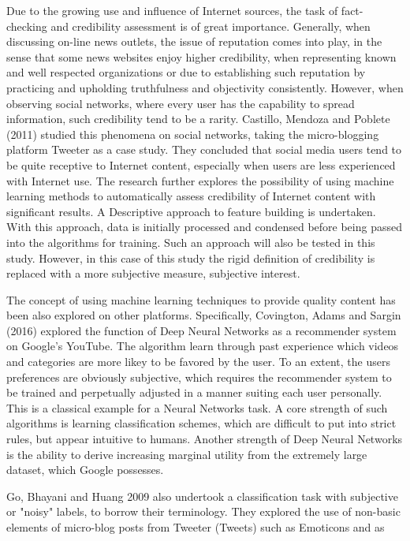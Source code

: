 		Due to the growing use and influence of Internet sources, the task of fact-checking and credibility assessment is of great importance. Generally, when discussing on-line news outlets, the issue of reputation comes into play, in the sense that some news websites enjoy higher credibility, when representing known and well respected organizations or due to establishing such reputation by practicing and upholding truthfulness and objectivity consistently. However, when observing social networks, where every user has the capability to spread information, such credibility tend to be a rarity. Castillo, Mendoza and Poblete (2011) \cite{castillo2011information} studied this phenomena on social networks, taking the micro-blogging platform Tweeter as a case study. They concluded that social media users tend to be quite receptive to Internet content, especially when users are less experienced with Internet use. The research further explores the possibility of using machine learning methods to automatically assess credibility of Internet content with significant results. A Descriptive approach to feature building is undertaken. With this approach, data is initially processed and condensed before being passed into the algorithms for training. Such an approach will also be tested in this study. However, in this case of this study the rigid definition of credibility is replaced with a more subjective measure, subjective interest.
		
		\par
		
		The concept of using machine learning techniques to provide quality content has been also explored on other platforms. Specifically, Covington, Adams and Sargin (2016) \cite{covington2016deep} explored the function of Deep Neural Networks as a recommender system on Google's YouTube. The algorithm learn through past experience which videos and categories are more likey to be favored by the user. To an extent, the users preferences are obviously subjective, which requires the recommender system to be trained and perpetually adjusted in a manner suiting each user personally. This is a classical example for a Neural Networks task. A core strength of such algorithms is learning classification schemes, which are difficult to put into strict rules, but appear intuitive to humans. Another strength of Deep Neural Networks is the ability to derive increasing marginal utility from the extremely large dataset, which Google possesses.
		
		\par
		
		Go, Bhayani and Huang 2009 \cite{go2009twitter} also undertook a classification task with subjective or "noisy" labels, to borrow their terminology. They explored the use of non-basic elements of micro-blog posts from Tweeter (Tweets) such as Emoticons and  as 
	